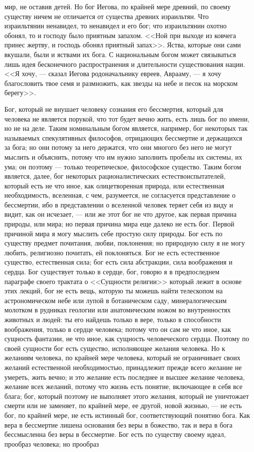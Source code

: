 \documentclass[12pt]{article}
\begin{document}
мир, не оставив детей. Но бог Иегова, по крайней мере древний, по своему существу ничем не отличается от существа древних израильтян. Что израильтянин ненавидел, то ненавидел и его бог; что израильтянин охотно обонял, то и господу было приятным запахом. <<Ной при выходе из ковчега принес жертву, и господь обонял приятный запах>>. Яства, которые они сами вкушали, были и яствами их бога. С национальным богом может связываться лишь идея бесконечного распространения и длительности существования нации. <<Я хочу, --- сказал Иегова родоначальнику евреев, Аврааму, --- я хочу благословить твое семя и размножить, как звезды на небе и песок на морском берегу>>. 

Бог, который не внушает человеку сознания его бессмертия, который для человека не является порукой, что тот будет вечно жить, есть лишь бог по имени, но не на деле. Таким номинальным богом является, например, бог некоторых так называемых спекулятивных философов, отрицающих бессмертие и держащихся за бога; но они потому за него держатся, что они многого без него не могут мыслить и объяснить, потому что им нужно заполнить пробелы их системы, их ума; он поэтому --- только теоретическое, философское существо. Таким богом является, далее, бог некоторых рационалистических естествоиспытателей, который есть не что иное, как олицетворенная природа, или естественная необходимость, вселенная, с чем, разумеется, не согласуется представление о бессмертии, ибо в представлении о вселенной человек теряет себя из виду и видит, как он исчезает, --- или же этот бог не что другое, как первая причина природы, или мира; но первая причина мира еще далеко не есть бог. Первой причиной мира я могу мыслить себе простую силу природы. Бог есть по существу предмет почитания, любви, поклонения; но природную силу я не могу любить, религиозно почитать, ей поклоняться. Бог не есть естественное существо, естественная сила; бог есть сила абстракции, сила воображения и сердца. Бог существует только в сердце, бог, говорю я в предпоследнем параграфе своего трактата о <<Сущности религии>>  который лежит в основе этих лекций, бог не есть вещь, которую ты можешь найти телескопом на астрономическом небе или лупой в ботаническом саду, минералогическим молотком в рудниках геологии или анатомическим ножом во внутренностях животных и людей: ты его найдешь только в вере, только в способности воображения, только в сердце человека; потому что он сам не что иное, как сущность фантазии, не что иное, как сущность человеческого сердца. Поэтому по своей сущности бог есть существо, исполняющее желания человека. Но к желаниям человека, по крайней мере человека, который не ограничивает своих желаний естественной необходимостью, принадлежит прежде всего желание не умереть, жить вечно; и это желание есть последнее и высшее желание человека, желание всех желаний, потому что жизнь есть понятие, включающее в себя все блага; бог, который поэтому не выполняет этого желания, который не уничтожает смерти или не заменяет, по крайней мере, ее другой, новой жизнью, --- не есть бог, по крайней мере, не есть истинный бог, соответствующий понятию бога. Как вера в бессмертие лишена основания без веры в божество, так и вера в бога бессмысленна без веры в бессмертие. Бог есть по существу своему идеал, прообраз человека; но прообраз 
\end{document}
